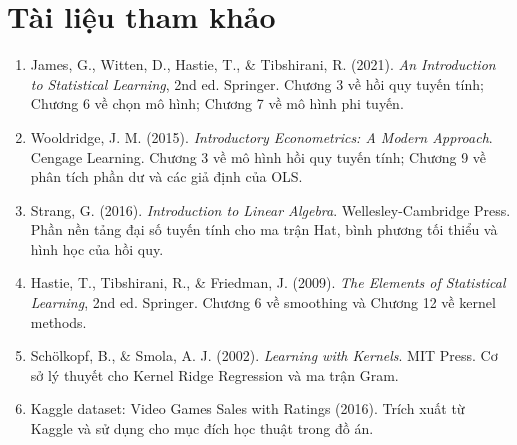 \documentclass[12pt,a4paper]{article}
\begin{document}
\section*{Tài liệu tham khảo}
\begin{enumerate}
    \item James, G., Witten, D., Hastie, T., \& Tibshirani, R. (2021). \textit{An Introduction to Statistical Learning}, 2nd ed. Springer. Chương 3 về hồi quy tuyến tính; Chương 6 về chọn mô hình; Chương 7 về mô hình phi tuyến.
    \item Wooldridge, J. M. (2015). \textit{Introductory Econometrics: A Modern Approach}. Cengage Learning. Chương 3 về mô hình hồi quy tuyến tính; Chương 9 về phân tích phần dư và các giả định của OLS.
    \item Strang, G. (2016). \textit{Introduction to Linear Algebra}. Wellesley-Cambridge Press. Phần nền tảng đại số tuyến tính cho ma trận Hat, bình phương tối thiểu và hình học của hồi quy.
    \item Hastie, T., Tibshirani, R., \& Friedman, J. (2009). \textit{The Elements of Statistical Learning}, 2nd ed. Springer. Chương 6 về smoothing và Chương 12 về kernel methods.
    \item Schölkopf, B., \& Smola, A. J. (2002). \textit{Learning with Kernels}. MIT Press. Cơ sở lý thuyết cho Kernel Ridge Regression và ma trận Gram.
    \item Kaggle dataset: Video Games Sales with Ratings (2016). Trích xuất từ Kaggle và sử dụng cho mục đích học thuật trong đồ án.
\end{enumerate}
\end{document}
